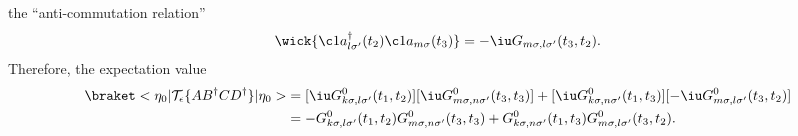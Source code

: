 \begin{solution}
\begin{enumext}
    the ``anti-commutation relation''
    \[
      \wick{\c1 a_{l\sigma'}^\dagger(t_2) \c1a_{m\sigma}(t_3)}
    = -\iu G_{m\sigma,l\sigma'}(t_3,t_2).
    \]
    Therefore, the expectation value
    \begin{align*}
      \braket<\eta_0|\mathcal T_\epsilon\{AB^\dagger CD^\dagger\}|\eta_0> &
    = [\iu G_{k\sigma,l\sigma'}^0(t_1,t_2)]
      [\iu G_{m\sigma,n\sigma'}^0(t_3,t_3)] +
      [\iu G_{k\sigma,n\sigma'}^0(t_1,t_3)]
      [-\iu G_{m\sigma,l\sigma'}^0(t_3,t_2)]\\
  & = -G_{k\sigma,l\sigma'}^0(t_1,t_2)
      G_{m\sigma,n\sigma'}^0(t_3,t_3)
    + G_{k\sigma,n\sigma'}^0(t_1,t_3)
      G_{m\sigma,l\sigma'}^0(t_3,t_2).
    \end{align*}
  \end{enumext}
\end{solution}

